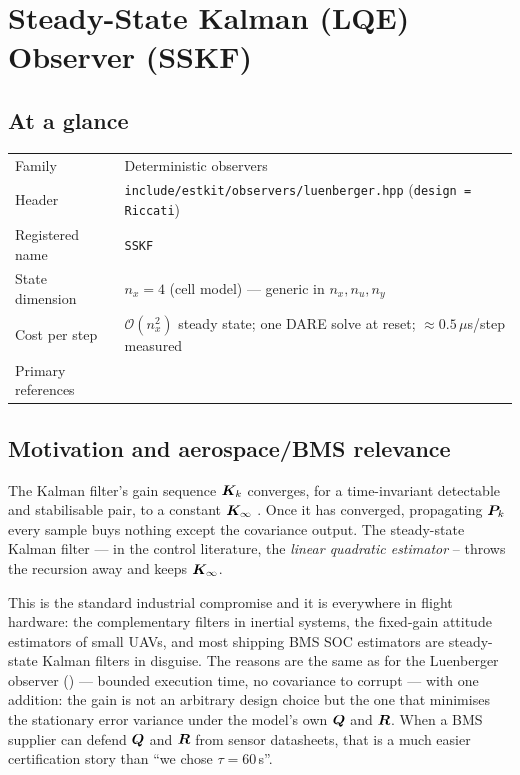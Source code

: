 \chapter{Steady-State Kalman (LQE) Observer (SSKF)}
\label{ch:sskf}

\section*{At a glance}
\begin{tabular}{@{}l>{\raggedright\arraybackslash}p{}@{}}
Family & Deterministic observers \\
Header & \texttt{include/estkit/observers/luenberger.hpp} (\texttt{design = Riccati}) \\
Registered name & \texttt{SSKF} \\
State dimension & $n_x = 4$ (cell model) --- generic in $n_x, n_u, n_y$ \\
Cost per step & $\mathcal{O}(n_x^2)$ steady state; one DARE solve at reset; $\approx 0.5\,\mu$s/step measured \\
Primary references & \cite{kalman1960,andersonmoore1979,luenberger1971,simon2006} \\
\end{tabular}

\section{Motivation and aerospace/BMS relevance}
The Kalman filter's gain sequence $\bm{K}_k$ converges, for a time-invariant detectable and
stabilisable pair, to a constant $\bm{K}_\infty$ \cite[Sec.~4.4]{andersonmoore1979}.  Once it has
converged, propagating $\bm{P}_k$ every sample buys nothing except the covariance output.  The
steady-state Kalman filter --- in the control literature, the \emph{linear quadratic estimator} --
throws the recursion away and keeps $\bm{K}_\infty$.

This is the standard industrial compromise and it is everywhere in flight hardware: the
complementary filters in inertial systems, the fixed-gain attitude estimators of small UAVs, and
most shipping BMS SOC estimators are steady-state Kalman filters in disguise.  The reasons are
the same as for the Luenberger observer () --- bounded execution time, no
covariance to corrupt --- with one addition: the gain is not an arbitrary design choice but the
one that minimises the stationary error variance under the model's own $\bm{Q}$ and $\bm{R}$.  When a
BMS supplier can defend $\bm{Q}$ and $\bm{R}$ from sensor datasheets, that is a much easier
certification story than ``we chose $\tau = 60$\,s''.

